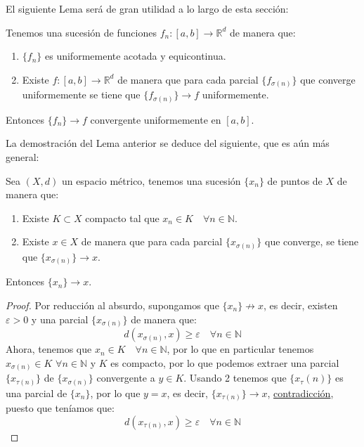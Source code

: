 \noindent
El siguiente Lema será de gran utilidad a lo largo de esta sección:
\begin{lema}\label{lema:Ascoli}
    Tenemos una sucesión de funciones $f_n:[a,b]\to \mathbb{R}^d$ de manera que:
    \begin{enumerate}
        \item $\{f_n\}$ es uniformemente acotada y equicontinua.
        \item Existe $f:[a,b]\to \mathbb{R}^d$ de manera que para cada parcial $\{f_{\sigma(n)}\}$ que converge uniformemente se tiene que $\{f_{\sigma(n)}\}\to f$ uniformemente.
    \end{enumerate}
    Entonces $\{f_n\}\to f$ convergente uniformemente en $[a,b]$.
\end{lema}

\noindent
La demostración del Lema anterior se deduce del siguiente, que es aún más general:
\begin{lema}
    Sea $(X,d)$ un espacio métrico, tenemos una sucesión $\{x_n\}$ de puntos de $X$ de manera que:
    \begin{enumerate}
        \item Existe $K\subset X$ compacto tal que $x_n\in K\quad \forall n\in \mathbb{N}$.
        \item Existe $x\in X$ de manera que para cada parcial $\{x_{\sigma(n)}\}$ que converge, se tiene que $\{x_{\sigma(n)}\} \to x$.
    \end{enumerate}
    Entonces $\{x_n\}\to x$.
    \begin{proof}
        Por reducción al absurdo, supongamos que $\{x_n\}\not\to x$, es decir, existen $\varepsilon>0$ y una parcial $\{x_{\sigma(n)}\}$ de manera que:
        \begin{equation*}
            d(x_{\sigma(n)},x) \geq \varepsilon\quad \forall n\in \mathbb{N}
        \end{equation*}
        Ahora, tenemos que ${}x_n \in K\quad \forall n\in \mathbb{N}$, por lo que en particular tenemos $x_{\sigma(n)}\in K$ $\forall n\in \mathbb{N}$ y $K$ es compacto, por lo que podemos extraer una parcial $\{x_{\tau(n)}\}$ de $\{x_{\sigma(n)}\}$ convergente a $y\in K$. Usando 2 tenemos que $\{x_\tau(n)\}$ es una parcial de $\{x_n\}$, por lo que $y = x$, es decir, $\{x_{\tau(n)}\}\to x$, \underline{contradicción}, puesto que teníamos que:
        \begin{equation*}
            d(x_{\tau(n)}, x) \geq \varepsilon \quad \forall n\in \mathbb{N}
        \end{equation*}
    \end{proof}
\end{lema}

